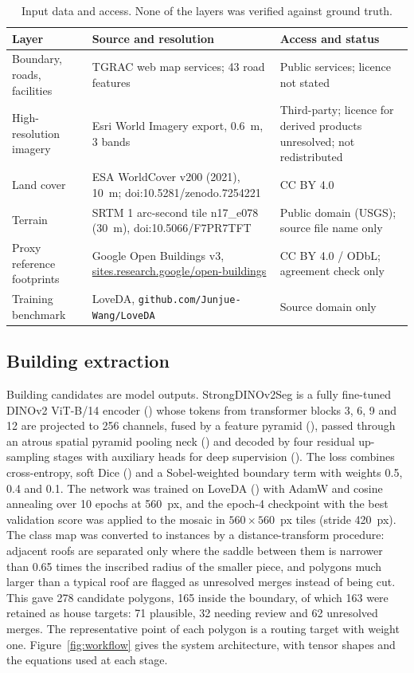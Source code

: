 \begin{table}[t]
\caption{Input data and access. None of the layers was verified against ground truth.}
\label{tab:data}
\centering
\footnotesize
\begin{tabular}{@{}>{\raggedright\arraybackslash}p{3.0cm}>{\raggedright\arraybackslash}p{5.9cm}>{\raggedright\arraybackslash}p{5.3cm}@{}}
\toprule
Layer & Source and resolution & Access and status\\
\midrule
Boundary, roads, facilities & TGRAC web map services; 43 road features & Public services; licence not stated\\
High-resolution imagery & Esri World Imagery export, 0.6~m, 3 bands & Third-party; licence for derived products unresolved; not redistributed\\
Land cover & ESA WorldCover v200 (2021), 10~m; doi:10.5281/zenodo.7254221 & CC BY 4.0\\
Terrain & SRTM 1 arc-second tile n17\_e078 (30~m), doi:10.5066/F7PR7TFT & Public domain (USGS); source file name only\\
Proxy reference footprints & Google Open Buildings v3, \url{sites.research.google/open-buildings} & CC BY 4.0 / ODbL; agreement check only\\
Training benchmark & LoveDA, \texttt{github.com/Junjue-Wang/LoveDA} & Source domain only\\
\bottomrule
\end{tabular}
\end{table}

\subsection{Building extraction}
Building candidates are model outputs. StrongDINOv2Seg is a fully fine-tuned DINOv2 ViT-B/14 encoder (\citealt{oquab2023dinov2}) whose tokens from transformer blocks 3, 6, 9 and 12 are projected to 256 channels, fused by a feature pyramid (\citealt{lin2017fpn}), passed through an atrous spatial pyramid pooling neck (\citealt{chen2018deeplabv3plus}) and decoded by four residual up-sampling stages with auxiliary heads for deep supervision (\citealt{lee2015dsn}). The loss combines cross-entropy, soft Dice (\citealt{milletari2016vnet}) and a Sobel-weighted boundary term with weights 0.5, 0.4 and 0.1. The network was trained on LoveDA (\citealt{wang2021loveda}) with AdamW and cosine annealing over 10 epochs at 560~px, and the epoch-4 checkpoint with the best validation score was applied to the mosaic in $560\times560$~px tiles (stride 420~px). The class map was converted to instances by a distance-transform procedure: adjacent roofs are separated only where the saddle between them is narrower than 0.65 times the inscribed radius of the smaller piece, and polygons much larger than a typical roof are flagged as unresolved merges instead of being cut. This gave 278 candidate polygons, 165 inside the boundary, of which 163 were retained as house targets: 71 plausible, 32 needing review and 62 unresolved merges. The representative point of each polygon is a routing target with weight one. Figure~\ref{fig:workflow} gives the system architecture, with tensor shapes and the equations used at each stage.


